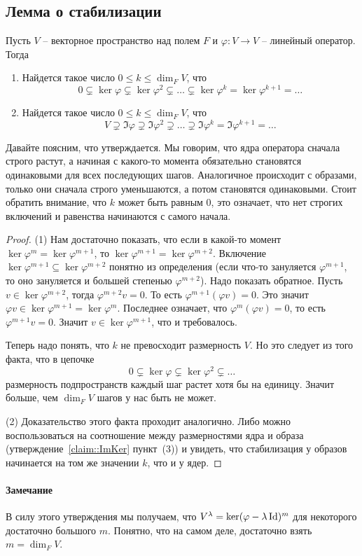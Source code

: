 \subsection{Лемма о стабилизации}

\begin{claim}\label{claim::StabilityLemma}
Пусть $V$ -- векторное пространство над полем $F$ и $\varphi \colon V\to V$ -- линейный оператор. Тогда
\begin{enumerate}
\item Найдется такое число $0\leqslant k\leqslant \dim_F V$, что
\[
0\subsetneq \ker \varphi \subsetneq \ker \varphi^2\subsetneq \ldots \subsetneq \ker\varphi^k = \ker \varphi^{k+1} = \ldots
\]
\item
Найдется такое число $0\leqslant k\leqslant \dim_F V$, что
\[
 V \supsetneq \Im \varphi \supsetneq \Im \varphi^2 \supsetneq \ldots \supsetneq \Im\varphi^k = \Im \varphi^{k+1} = \ldots
\]
\end{enumerate}
\end{claim}

Давайте поясним, что утверждается. Мы говорим, что ядра оператора сначала строго растут, а начиная с какого-то момента обязательно становятся одинаковыми для всех последующих шагов. Аналогичное происходит с образами, только они сначала строго уменьшаются, а потом становятся одинаковыми. Стоит обратить внимание, что $k$ может быть равным $0$, это означает, что нет строгих включений и равенства начинаются с самого начала.

\begin{proof}

(1) Нам достаточно показать, что если в какой-то момент $\ker \varphi^m = \ker\varphi^{m+1}$, то $\ker \varphi^{m+1} = \ker\varphi^{m+2}$. Включение $\ker \varphi^{m+1}\subseteq \ker \varphi^{m+2}$ понятно из определения (если что-то зануляется $\varphi^{m+1}$, то оно зануляется и большей степенью $\varphi^{m+2}$). Надо показать обратное. Пусть $v\in \ker \varphi^{m+2}$, тогда $\varphi^{m+2}v = 0$. То есть $\varphi^{m+1}(\varphi v) = 0$. Это значит $\varphi v \in \ker \varphi^{m+1} = \ker \varphi^m$. Последнее означает, что $\varphi^m(\varphi v) = 0$, то есть $\varphi^{m+1} v = 0$. Значит $v\in \ker \varphi^{m+1}$, что и требовалось.

Теперь надо понять, что $k$ не превосходит размерность $V$. Но это следует из того факта, что в цепочке
\[
0\subsetneq \ker \varphi \subsetneq\ker\varphi^2\subsetneq \ldots
\]
размерность подпространств каждый шаг растет хотя бы на единицу. Значит больше, чем $\dim_F V$ шагов у нас быть не может.

(2) Доказательство этого факта проходит аналогично. Либо можно воспользоваться на соотношение между размерностями ядра и образа (утверждение~\ref{claim::ImKer} пункт~(3)) и увидеть, что стабилизация у образов начинается на том же значении $k$, что и у ядер.
\end{proof}

\paragraph{Замечание}


В силу этого утверждения мы получаем, что $V^\lambda = \ker (\varphi - \lambda \operatorname{Id})^m$ для некоторого достаточно большого $m$. Понятно, что на самом деле, достаточно взять $m = \dim_F V$.


